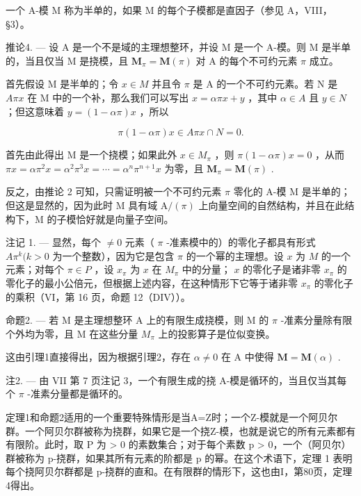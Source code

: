 一个 A-模 M 称为半单的，如果 M 的每个子模都是直因子（参见 A，VIII，§3）。

推论4. --- 设 A 是一个不是域的主理想整环，并设 M 是一个 A-模。则 M 是半单的，当且仅当 M 是挠模，且 \(\mathbf{M}_{\pi} = \mathbf{M}(\pi)\) 对 A 的每个不可约元素 \(\pi\) 成立。

首先假设 M 是半单的；令 \(x \in M\) 并且令 \(\pi\) 是 A 的一个不可约元素。若 N 是 \(A\pi x\) 在 M 中的一个补，那么我们可以写出 \(x = \alpha\pi x + y\) ，其中 \(\alpha \in A\) 且 \(y \in N\) ；但这意味着 \(y = (1 - \alpha\pi)x\) ，所以

\[
\pi (1 - \alpha \pi) x \in A \pi x \cap N = 0.
\]

首先由此得出 M 是一个挠模；如果此外 \(x \in M_{\pi}\) ，则 \(\pi(1 - \alpha\pi)x = 0\) ，从而 \(\pi x = \alpha\pi^{2}x = \alpha^{2}\pi^{3}x = \cdots = \alpha^{n}\pi^{n+1}x\) 为零，且 \(\mathbf{M}_{\pi} = \mathbf{M}(\pi)\) .

反之，由推论 2 可知，只需证明被一个不可约元素 \(\pi\) 零化的 A-模 M 是半单的；但这是显然的，因为此时 M 具有域 \(\mathrm{A}/(\pi)\) 上向量空间的自然结构，并且在此结构下，M 的子模恰好就是向量子空间。

注记 1. --- 显然，每个 \(\neq 0\) 元素（ \(\pi\) -准素模中的）的零化子都具有形式 \(A\pi^k (k > 0\) 为一个整数），因为它是包含 \(\pi\) 的一个幂的主理想。设 \(x\) 为 \(M\) 的一个元素；对每个 \(\pi \in P\) ，设 \(x_{\pi}\) 为 \(x\) 在 \(M_{\pi}\) 中的分量； \(x\) 的零化子是诸非零 \(x_{\pi}\) 的零化子的最小公倍元，但根据上述内容，在这种情形下它等于诸非零 \(x_{\pi}\) 的零化子的乘积（VI，第 16 页，命题 12（DIV））。

命题2. --- 若 M 是主理想整环 A 上的有限生成挠模，则 M 的 \(\pi\) -准素分量除有限个外均为零，且 M 在这些分量 \(M_{\pi}\) 上的投影算子是位似变换。

这由引理1直接得出，因为根据引理2，存在 \(\alpha \neq 0\) 在 A 中使得 \(\mathbf{M} = \mathbf{M}(\alpha)\) .

注2. --- 由 VII 第 7 页注记 3，一个有限生成的挠 A-模是循环的，当且仅当其每个 \(\pi\) -准素分量都是循环的。

定理1和命题2适用的一个重要特殊情形是当A=Z时；一个Z-模就是一个阿贝尔群。一个阿贝尔群被称为挠群，如果它是一个挠Z-模，也就是说它的所有元素都有有限阶。此时，取 P 为 \textgreater{} 0 的素数集合；对于每个素数 p \textgreater{} 0，一个（阿贝尔）群被称为 p-挠群，如果其所有元素的阶都是 p 的幂。在这个术语下，定理 1 表明每个挠阿贝尔群都是 p-挠群的直和。在有限群的情形下，这也由I，第80页，定理4得出。

